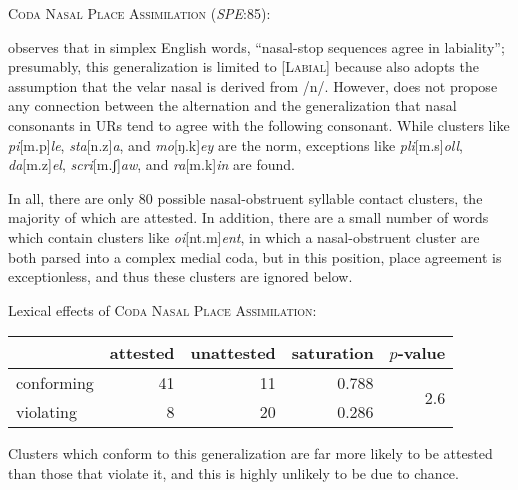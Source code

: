 \ex \textsc{Coda Nasal Place Assimilation} (\emph{SPE}:85): \\
\label{CNPA}
\xe

\citet[][175]{Pierrehumbert1994} observes that in simplex English words, ``nasal-stop sequences agree in labiality''; presumably, this generalization is limited to [\textsc{Labial}] because \citeauthor{Pierrehumbert1994} also adopts the assumption that the velar nasal is derived from /n/. However, \citeauthor{Pierrehumbert1994} does not propose any connection between the alternation and the generalization that nasal consonants in URs tend to agree with the following consonant. While clusters like \emph{pi}[m.p]\emph{le}, \emph{sta}[n.z]\emph{a}, and \emph{mo}[ŋ.k]\emph{ey} are the norm, exceptions like \emph{pli}[m.s]\emph{oll}, \emph{da}[m.z]\emph{el}, \emph{scri}[m.ʃ]\emph{aw}, and \emph{ra}[m.k]\emph{in} are found.

In all, there are only 80 possible nasal-obstruent syllable contact clusters, the majority of which are attested. In addition, there are a small number of words which contain clusters like \emph{oi}[nt.m]\emph{ent}, in which a nasal-obstruent cluster are both parsed into a complex medial coda, but in this position, place agreement is exceptionless, and thus these clusters are ignored below.

\ex Lexical effects of \textsc{Coda Nasal Place Assimilation}: \vspace{6pt} \\
\begin{tabular}{l r r r r}
\toprule
           & attested & unattested & saturation & $p$-value \\
\midrule
conforming & 41 & 11 & 0.788 & \multirow{2}{*}{2.6\e{-05}}\\
violating  & 8  & 20 & 0.286 \\
\bottomrule
\end{tabular}
\xe

\noindent
Clusters which conform to this generalization are far more likely to be attested than those that violate it, and this is highly unlikely to be due to chance.

